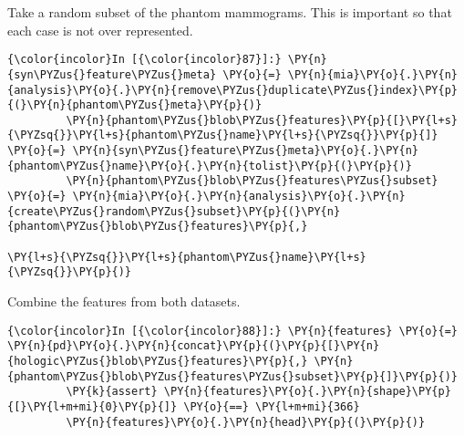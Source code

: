     Take a random subset of the phantom mammograms. This is important so
that each case is not over represented.

    \begin{Verbatim}[commandchars=\\\{\}]
{\color{incolor}In [{\color{incolor}87}]:} \PY{n}{syn\PYZus{}feature\PYZus{}meta} \PY{o}{=} \PY{n}{mia}\PY{o}{.}\PY{n}{analysis}\PY{o}{.}\PY{n}{remove\PYZus{}duplicate\PYZus{}index}\PY{p}{(}\PY{n}{phantom\PYZus{}meta}\PY{p}{)}
         \PY{n}{phantom\PYZus{}blob\PYZus{}features}\PY{p}{[}\PY{l+s}{\PYZsq{}}\PY{l+s}{phantom\PYZus{}name}\PY{l+s}{\PYZsq{}}\PY{p}{]} \PY{o}{=} \PY{n}{syn\PYZus{}feature\PYZus{}meta}\PY{o}{.}\PY{n}{phantom\PYZus{}name}\PY{o}{.}\PY{n}{tolist}\PY{p}{(}\PY{p}{)}
         \PY{n}{phantom\PYZus{}blob\PYZus{}features\PYZus{}subset} \PY{o}{=} \PY{n}{mia}\PY{o}{.}\PY{n}{analysis}\PY{o}{.}\PY{n}{create\PYZus{}random\PYZus{}subset}\PY{p}{(}\PY{n}{phantom\PYZus{}blob\PYZus{}features}\PY{p}{,}
                                                                          \PY{l+s}{\PYZsq{}}\PY{l+s}{phantom\PYZus{}name}\PY{l+s}{\PYZsq{}}\PY{p}{)}
\end{Verbatim}

    Combine the features from both datasets.

    \begin{Verbatim}[commandchars=\\\{\}]
{\color{incolor}In [{\color{incolor}88}]:} \PY{n}{features} \PY{o}{=} \PY{n}{pd}\PY{o}{.}\PY{n}{concat}\PY{p}{(}\PY{p}{[}\PY{n}{hologic\PYZus{}blob\PYZus{}features}\PY{p}{,} \PY{n}{phantom\PYZus{}blob\PYZus{}features\PYZus{}subset}\PY{p}{]}\PY{p}{)}
         \PY{k}{assert} \PY{n}{features}\PY{o}{.}\PY{n}{shape}\PY{p}{[}\PY{l+m+mi}{0}\PY{p}{]} \PY{o}{==} \PY{l+m+mi}{366}
         \PY{n}{features}\PY{o}{.}\PY{n}{head}\PY{p}{(}\PY{p}{)}
\end{Verbatim}

